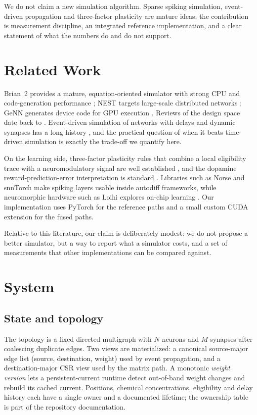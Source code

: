 \documentclass[11pt]{article}
\begin{document}
We do not claim a new simulation algorithm. Sparse spiking simulation,
event-driven propagation and three-factor plasticity are mature ideas; the
contribution is measurement discipline, an integrated reference implementation,
and a clear statement of what the numbers do and do not support.

\section{Related Work}

Brian~2 provides a mature, equation-oriented simulator with strong CPU and
code-generation performance \citep{stimberg2019brian2}; NEST targets
large-scale distributed networks \citep{gewaltig2007nest}; GeNN generates
device code for GPU execution \citep{yavuz2016genn}. Reviews of the design space
date back to \citet{brette2007simulation}. Event-driven simulation of networks
with delays and dynamic synapses has a long history
\citep{mattia2000efficient}, and the practical question of when it beats
time-driven simulation is exactly the trade-off we quantify here.

On the learning side, three-factor plasticity rules that combine a local
eligibility trace with a neuromodulatory signal are well established
\citep{fremaux2016neuromodulated}, and the dopamine reward-prediction-error
interpretation is standard \citep{schultz1997neural}. Libraries such as Norse
\citep{pehle2021norse} and snnTorch \citep{eshraghian2023training} make spiking
layers usable inside autodiff frameworks, while neuromorphic hardware such as
Loihi explores on-chip learning \citep{davies2018loihi}. Our implementation uses
PyTorch \citep{paszke2019pytorch} for the reference paths and a small custom CUDA
extension for the fused paths.

Relative to this literature, our claim is deliberately modest: we do not propose
a better simulator, but a way to report what a simulator costs, and a set of
measurements that other implementations can be compared against.

\section{System}

\subsection{State and topology}

The topology is a fixed directed multigraph with $N$ neurons and $M$ synapses
after coalescing duplicate edges. Two views are materialized: a canonical
source-major edge list (source, destination, weight) used by event propagation,
and a destination-major CSR view used by the matrix path. A monotonic
\emph{weight version} lets a persistent-current runtime detect out-of-band weight
changes and rebuild its cached current. Positions, chemical concentrations,
eligibility and delay history each have a single owner and a documented lifetime;
the ownership table is part of the repository documentation.
\end{document}
